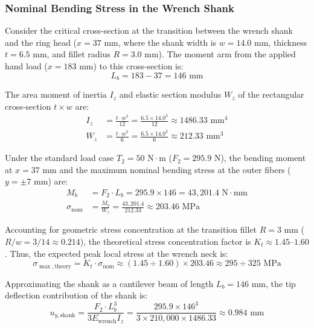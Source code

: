 \documentclass[12pt,a4paper]{article}
\begin{document}
\subsubsection{Nominal Bending Stress in the Wrench Shank}
Consider the critical cross-section at the transition between the wrench shank and the ring head ($x = 37\text{ mm}$, where the shank width is $w = 14.0\text{ mm}$, thickness $t = 6.5\text{ mm}$, and fillet radius $R = 3.0\text{ mm}$). The moment arm from the applied hand load ($x = 183\text{ mm}$) to this cross-section is:
\begin{equation}
    L_b = 183 - 37 = 146\text{ mm}
\end{equation}

The area moment of inertia $I_z$ and elastic section modulus $W_z$ of the rectangular cross-section $t \times w$ are:
\begin{align}
    I_z &= \frac{t \cdot w^3}{12} = \frac{6.5 \times 14.0^3}{12} \approx 1486.33\text{ mm}^4 \\
    W_z &= \frac{t \cdot w^2}{6} = \frac{6.5 \times 14.0^2}{6} \approx 212.33\text{ mm}^3
\end{align}

Under the standard load case $T_2 = 50\text{ N}\cdot\text{m}$ ($F_2 = 295.9\text{ N}$), the bending moment at $x = 37\text{ mm}$ and the maximum nominal bending stress at the outer fibers ($y = \pm 7\text{ mm}$) are:
\begin{align}
    M_b &= F_2 \cdot L_b = 295.9 \times 146 = 43,201.4\text{ N}\cdot\text{mm} \\
    \sigma_{\text{nom}} &= \frac{M_b}{W_z} = \frac{43,201.4}{212.33} \approx 203.46\text{ MPa}
\end{align}

Accounting for geometric stress concentration at the transition fillet $R = 3\text{ mm}$ ($R/w = 3/14 \approx 0.214$), the theoretical stress concentration factor is $K_t \approx 1.45\text{--}1.60$. Thus, the expected peak local stress at the wrench neck is:
\begin{equation}
    \sigma_{\max,\text{theory}} = K_t \cdot \sigma_{\text{nom}} \approx (1.45 \div 1.60) \times 203.46 \approx 295 \div 325\text{ MPa}
\end{equation}

Approximating the shank as a cantilever beam of length $L_b = 146\text{ mm}$, the tip deflection contribution of the shank is:
\begin{equation}
    u_{y,\text{shank}} = \frac{F_2 \cdot L_b^3}{3 E_{\text{wrench}} I_z} = \frac{295.9 \times 146^3}{3 \times 210,000 \times 1486.33} \approx 0.984\text{ mm}
\end{equation}
\end{document}
